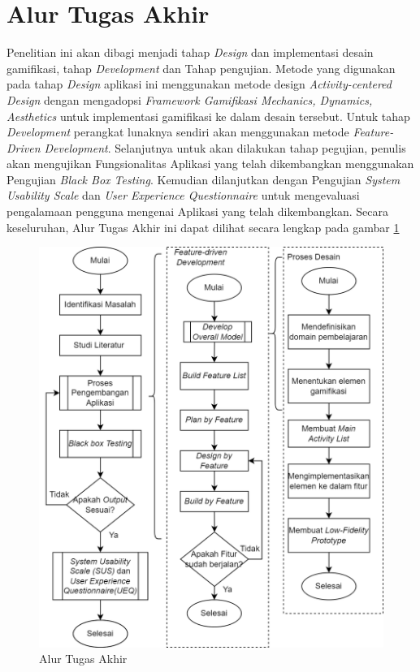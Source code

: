 \section{Alur Tugas Akhir}
Penelitian ini akan dibagi menjadi tahap \textit{Design} dan implementasi desain gamifikasi, tahap \textit{Development} dan Tahap pengujian.
Metode yang digunakan pada tahap \textit{Design} aplikasi ini menggunakan metode design \textit{Activity-centered Design} 
dengan mengadopsi \textit{Framework Gamifikasi Mechanics, Dynamics, Aesthetics} untuk implementasi gamifikasi ke dalam desain tersebut.
Untuk tahap \textit{Development} perangkat lunaknya sendiri akan menggunakan metode \textit{Feature-Driven Development}.
Selanjutnya untuk akan dilakukan tahap pegujian, penulis akan mengujikan Fungsionalitas Aplikasi yang telah dikembangkan menggunakan Pengujian \textit{Black Box Testing}.
Kemudian dilanjutkan dengan Pengujian \textit{System Usability Scale} dan \textit{User Experience Questionnaire} untuk mengevaluasi pengalamaan pengguna mengenai Aplikasi yang telah dikembangkan.
Secara keseluruhan, Alur Tugas Akhir ini dapat dilihat secara lengkap pada gambar \ref{Fig:Alur Tugas Akhir}
\begin{figure}[H]
	\centering
	\includegraphics[width=\textwidth-1cm]{contents/chapter-3/images/Alur-tugas-akhir-2.png}
	\caption{Alur Tugas Akhir}
	\label{Fig:Alur Tugas Akhir}
\end{figure}
